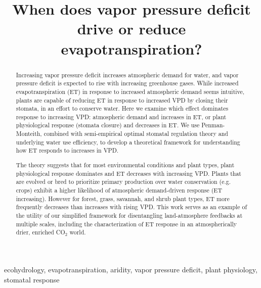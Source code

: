 \documentclass[draft,linenumbers]{afmjournal}
\begin{document}
\title{When does vapor pressure deficit drive or reduce
  evapotranspiration?}



 


\begin{abstract}
  Increasing vapor pressure deficit increases atmospheric demand for  water, and vapor pressure deficit is expected to rise with  increasing greenhouse gases. While increased evapotranspiration (ET) in  response to increased atmospheric demand seems intuitive, plants are  capable of reducing ET in response to increased VPD by closing their  stomata, in an effort to conserve water. Here we examine which  effect dominates response to increasing VPD: atmospheric demand and  increases in ET, or plant physiological response (stomata closure)  and decreases in ET. We use Penman-Monteith, combined with  semi-empirical optimal stomatal regulation theory and underlying  water use efficiency, to develop a theoretical framework for  understanding how ET responds to increases in VPD.

  The theory suggests that for most environmental conditions and plant  types, plant physiological response dominates and ET decreases with  increasing VPD. Plants that are evolved or bred to prioritize  primary production over water conservation (e.g. crops) exhibit a  higher likelihood of atmospheric demand-driven response (ET  increasing). However for forest, grass, savannah, and shrub plant  types, ET more frequently decreases than increases with rising  VPD. This work serves as an example of the utility of  our simplified framework for disentangling land-atmosphere feedbacks  at multiple scales, including the characterization of ET response in  an atmospherically drier, enriched CO$_2$ world. 
\end{abstract}

\begin{keypoints}
\item ecohydrology, evapotranspiration, aridity, vapor pressure
  deficit, plant physiology, stomatal response
\end{keypoints}
\end{document}

